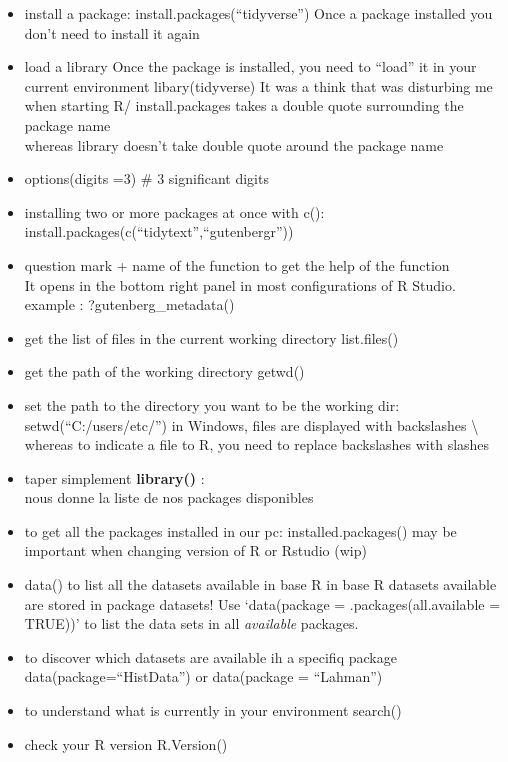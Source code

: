 \documentclass[
]{book}
\begin{document}
\begin{itemize}
\item
  install a package: install.packages(``tidyverse'')
  Once a package installed you don't need to install it again
\item
  load a library
  Once the package is installed, you need to ``load'' it in your current environment
  libary(tidyverse)
  It was a think that was disturbing me when starting R/
  install.packages takes a double quote surrounding the package name\\
  whereas library doesn't take double quote around the package name
\item
  options(digits =3) \# 3 significant digits
\item
  installing two or more packages at once with c():\\
  install.packages(c(``tidytext'',``gutenbergr''))
\item
  question mark + name of the function to get the help of the function\\
  It opens in the bottom right panel in most configurations of R Studio.
  example : ?gutenberg\_metadata()
\item
  get the list of files in the current working directory
  list.files()
\item
  get the path of the working directory
  getwd()
\item
  set the path to the directory you want to be the working dir:
  setwd(``C:/users/etc/'')
  in Windows, files are displayed with backslashes \textbackslash{} whereas to indicate
  a file to R, you need to replace backslashes with slashes
\item
  taper simplement \textbf{library()} :\\
  nous donne la liste de nos packages disponibles
\item
  to get all the packages installed in our pc:
  installed.packages()
  may be important when changing version of R or Rstudio (wip)
\item
  data() to list all the datasets available in base R
  in base R datasets available are stored in package datasets!
  Use `data(package = .packages(all.available = TRUE))'
  to list the data sets in all \emph{available} packages.
\item
  to discover which datasets are available ih a specifiq package
  data(package=``HistData'')
  or data(package = ``Lahman'')
\item
  to understand what is currently in your environment
  search()
\item
  check your R version
  R.Version()
\end{itemize}
\end{document}
